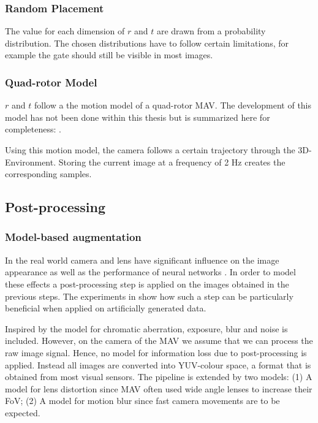 \subsubsection{Random Placement}
	
The value for each dimension of $r$ and $t$ are drawn from a probability distribution. The chosen distributions have to follow certain limitations, for example the gate should still be visible in most images.
	
\subsubsection{Quad-rotor Model}
	
$r$ and $t$ follow a the motion model of a quad-rotor \ac{MAV}.  The development of this model has not been done within this thesis but is summarized here for completeness: .

Using this motion model, the camera follows a certain trajectory through the 3D-Environment. Storing the current image at a frequency of 2 Hz creates the corresponding samples.
	
\subsection{Post-processing}

\subsubsection{Model-based augmentation}
In the real world camera and lens have significant influence on the image appearance as well as the performance of neural networks \cite{Andreopoulos2012,Dodge2016a}. In order to model these effects a post-processing step is applied on the images obtained in the previous steps. The experiments in \cite{Carlson2018} show how such a step can be particularly beneficial when applied on artificially generated data. 

Inspired by \cite{Carlson2018} the model for chromatic aberration, exposure, blur and noise is included. However, on the camera of the \ac{MAV} we assume that we can process the raw image signal. Hence, no model for information loss due to post-processing is applied. Instead all images are converted into YUV-colour space, a format that is obtained from most visual sensors. The pipeline is extended by two models: (1) A model for lens distortion since \ac{MAV} often used wide angle lenses to increase their \ac{FoV}; (2) A model for motion blur since fast camera movements are to be expected.

